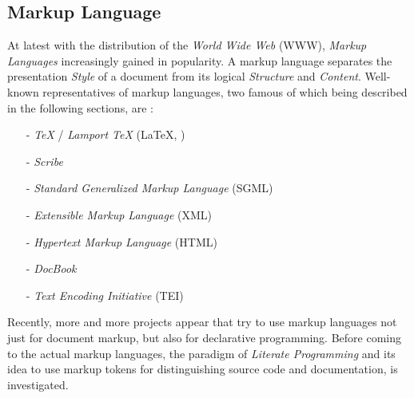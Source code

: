 %
%
%
%
%
%
%

\subsection{Markup Language}
\label{markup_language_heading}

At latest with the distribution of the \emph{World Wide Web} (WWW),
\emph{Markup Languages} increasingly gained in popularity. A markup language
separates the presentation \emph{Style} of a document from its logical
\emph{Structure} and \emph{Content}. Well-known representatives of markup
languages, two famous of which being described in the following sections, are
\cite{wikipedia}:

\begin{itemize}
    \item[-] \emph{\TeX} / \emph{Lamport \TeX} (\LaTeX, \LaTeXe)
    \item[-] \emph{Scribe}
    \item[-] \emph{Standard Generalized Markup Language} (SGML)
    \item[-] \emph{Extensible Markup Language} (XML)
    \item[-] \emph{Hypertext Markup Language} (HTML)
    \item[-] \emph{DocBook}
    \item[-] \emph{Text Encoding Initiative} (TEI)
\end{itemize}

Recently, more and more projects appear that try to use markup languages not
just for document markup, but also for declarative programming.%
Before coming to the actual markup languages, the paradigm of
\emph{Literate Programming} and its idea to use markup tokens for distinguishing
source code and documentation, is investigated.




